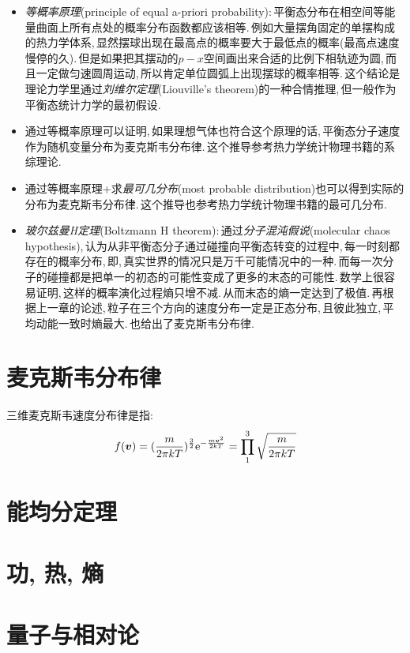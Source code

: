 \begin{itemize}
	\item \emph{等概率原理}(principle of equal a-priori probability):\,平衡态分布在相空间等能量曲面上所有点处的概率分布函数都应该相等.\,例如大量摆角固定的单摆构成的热力学体系,\,显然摆球出现在最高点的概率要大于最低点的概率(最高点速度慢停的久).\,但是如果把其摆动的$p-x$空间画出来合适的比例下相轨迹为圆,\,而且一定做匀速圆周运动,\,所以肯定单位圆弧上出现摆球的概率相等.\,这个结论是理论力学里通过\emph{刘维尔定理}(Liouville's theorem)的一种合情推理,\,但一般作为平衡态统计力学的最初假设.

	\item 通过等概率原理可以证明,\,如果理想气体也符合这个原理的话,\,平衡态分子速度作为随机变量分布为麦克斯韦分布律.\,这个推导参考热力学统计物理书籍的系综理论.
	\item 通过等概率原理+求\emph{最可几分布}(most probable distribution)也可以得到实际的分布为麦克斯韦分布律.\,这个推导也参考热力学统计物理书籍的最可几分布.
	\item \emph{玻尔兹曼H定理}(Boltzmann H theorem):\,通过\emph{分子混沌假说}(molecular chaos hypothesis),\,认为从非平衡态分子通过碰撞向平衡态转变的过程中,\,每一时刻都存在的概率分布,\,即,\,真实世界的情况只是万千可能情况中的一种.\,而每一次分子的碰撞都是把单一的初态的可能性变成了更多的末态的可能性.\,数学上很容易证明,\,这样的概率演化过程熵只增不减.\,从而末态的熵一定达到了极值.\,再根据上一章的论述,\,粒子在三个方向的速度分布一定是正态分布,\,且彼此独立,\,平均动能一致时熵最大.\,也给出了麦克斯韦分布律.
\end{itemize}


\section{麦克斯韦分布律}

三维麦克斯韦速度分布律是指:
\[f(\boldsymbol{v})=(\frac{m}{2\pi kT})^\frac{3}{2}{\rm e}^{-\frac{m\boldsymbol{v}^2}{2kT}}=\prod_1^3 \sqrt{\frac{m}{2\pi kT}}\]

\section{能均分定理}

\section{功, 热, 熵}

\section{量子与相对论}